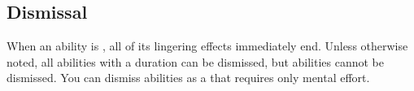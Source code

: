   \subsection{Dismissal}\label{Dismissal}
    When an ability is , all of its lingering effects immediately end.
    Unless otherwise noted, all \magical abilities with a duration can be dismissed, but  abilities cannot be dismissed.
    You can dismiss abilities as a  that requires only mental effort.
